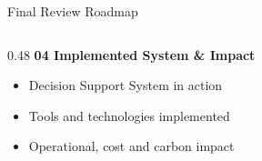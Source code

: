 \documentclass[aspectratio=169,10pt]{beamer}
\begin{document}
\begin{frame}{Final Review Roadmap}
\begin{columns}[T,totalwidth=\textwidth]
\begin{column}{0.48\textwidth}
        \vspace{0.25cm}
        \textbf{\normalsize\color{Primary} 04 \quad Implemented System \& Impact}
        \vspace{0.08cm}

        \begin{itemize}
            \setlength{\itemsep}{2pt}
            \item Decision Support System in action
            \item Tools and technologies implemented
            \item Operational, cost and carbon impact
        \end{itemize}
    \end{column}
\end{columns}

\vfill
\end{frame}

\end{document}
